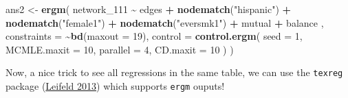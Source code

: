 \documentclass[
]{book}
\newenvironment{Shaded}{\begin{snugshade}}{\end{snugshade}}
\newcommand{\AttributeTok}[1]{\textcolor[rgb]{0.13,0.29,0.53}{#1}}
\newcommand{\DecValTok}[1]{\textcolor[rgb]{0.00,0.00,0.81}{#1}}
\newcommand{\FunctionTok}[1]{\textcolor[rgb]{0.13,0.29,0.53}{\textbf{#1}}}
\newcommand{\NormalTok}[1]{#1}
\newcommand{\OtherTok}[1]{\textcolor[rgb]{0.56,0.35,0.01}{#1}}
\newcommand{\SpecialCharTok}[1]{\textcolor[rgb]{0.81,0.36,0.00}{\textbf{#1}}}
\newcommand{\StringTok}[1]{\textcolor[rgb]{0.31,0.60,0.02}{#1}}
\begin{document}
\begin{Shaded}
\begin{Highlighting}[]
\NormalTok{ans2 }\OtherTok{\textless{}{-}} \FunctionTok{ergm}\NormalTok{(}
\NormalTok{  network\_111 }\SpecialCharTok{\textasciitilde{}}
\NormalTok{    edges }\SpecialCharTok{+}
    \FunctionTok{nodematch}\NormalTok{(}\StringTok{"hispanic"}\NormalTok{) }\SpecialCharTok{+}
    \FunctionTok{nodematch}\NormalTok{(}\StringTok{"female1"}\NormalTok{) }\SpecialCharTok{+}
    \FunctionTok{nodematch}\NormalTok{(}\StringTok{"eversmk1"}\NormalTok{) }\SpecialCharTok{+} 
\NormalTok{    mutual }\SpecialCharTok{+}
\NormalTok{    balance}
\NormalTok{    ,}
  \AttributeTok{constraints =} \SpecialCharTok{\textasciitilde{}}\FunctionTok{bd}\NormalTok{(}\AttributeTok{maxout =} \DecValTok{19}\NormalTok{),}
  \AttributeTok{control =} \FunctionTok{control.ergm}\NormalTok{(}
    \AttributeTok{seed        =} \DecValTok{1}\NormalTok{,}
    \AttributeTok{MCMLE.maxit =} \DecValTok{10}\NormalTok{,}
    \AttributeTok{parallel    =} \DecValTok{4}\NormalTok{,}
    \AttributeTok{CD.maxit    =} \DecValTok{10}
\NormalTok{    )}
\NormalTok{  )}
\end{Highlighting}
\end{Shaded}

Now, a nice trick to see all regressions in the same table, we can use the \texttt{texreg} package (\protect\hyperlink{ref-R-texreg}{Leifeld 2013}) which supports \texttt{ergm} ouputs!
\end{document}
